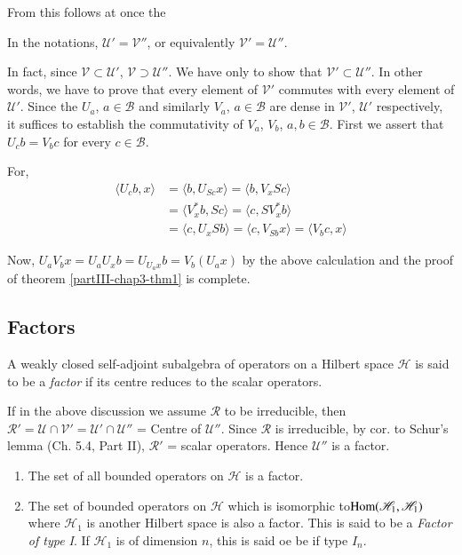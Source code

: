  
From this follows at once the 

\setcounter{thm}{0} 
 \begin{thm}\label{partIII-chap3-thm1}%
 In the notations, $\mathcal{U}'=\mathcal{V}''$, or equivalently
 $\mathcal{V}'=\mathcal{U}''$. 
\end{thm}
  
In fact, since $\mathcal{V} \subset \mathcal{U}'$, $\mathcal{V}\supset
\mathcal{U}''$. We have only to show 
that $\mathcal{V}'\subset \mathcal{U}''$. In other words, we have to
prove that every element of $\mathcal{V}'$ commutes with every element
of $\mathcal{U}'$. Since the $U_a$, $a \in \mathscr{B}$
and similarly $V_{a}$, $a\in\mathscr{B}$ are dense in $\mathcal{V}'$,
$\mathcal{U}'$ respectively, it suffices to establish the
commutativity of $V_{a}$, $V_{b}$, $a,b\in\mathscr{B}$. 
First we assert
that $U_c b=V_b c$ for every $c\in\mathscr{B}$. 

For,
\begin{align*}
\langle U_c b,x\rangle &= \langle b,U_{Sc}x\rangle  = \langle b,V_xSc\rangle\\
&= \langle V^*_xb,Sc\rangle  = \langle c,SV^*_xb \rangle\\
&= \langle c,U_x Sb \rangle =\langle c,V_{Sb}x\rangle = \langle V_b
c,x\rangle 
\end{align*}

Now, $U_aV_bx=U_aU_x b = U_{U_a x} b=V_{b}(U_{a}x)$ by the above
calculation and the proof of theorem \ref{partIII-chap3-thm1} is complete. 
 
\subsection{Factors}\label{partIII-chap3-sec3.3}\pageoriginale%

A weakly closed self-adjoint subalgebra of operators on a Hilbert space
$\mathscr{H}$ is said to be a {\em factor} if its centre reduces to
the scalar operators. 

If in the above discussion we assume $\mathscr{R}$ to be irreducible,
then $\mathscr{R}'= \mathcal{U}\cap \mathcal{V}'= \mathcal{U}'\cap
\mathcal{U}''$ = Centre of $\mathcal{U}''$. Since $\mathscr{R}$ is
irreducible, by cor. to Schur's lemma (Ch. 5.4, Part II),
$\mathscr{R}'$ = scalar operators. Hence $\mathcal{U}''$ is a factor. 

\begin{examples*}
\begin{enumerate}
\renewcommand{\labelenumi}{(\theenumi)}
\item The set of all bounded operators on $\mathscr{H}$ is  a factor.

\item The set of bounded operators on $\mathscr{H}$ which is isomorphic
  to\break $\operatorname{Hom}(\mathscr{H}_1,\mathscr{H}_1)$ where $\mathscr{H}_1$ is
  another Hilbert space is also a factor. This is said to be a {\em
    Factor of type I}. If $\mathscr{H}_1$ is of dimension $n$, this is
  said oe be if type $I_n$. 
\end{enumerate}
\end{examples*}

